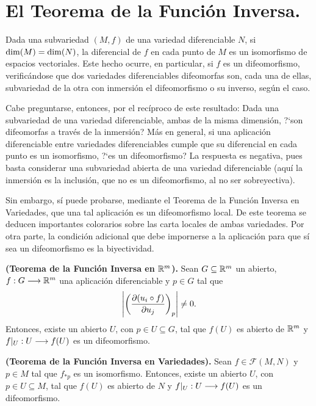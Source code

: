 \documentclass[Cursovd_portada.tex]{subfiles}
\begin{document}
\section{El Teorema de la Función Inversa.}
\hs Dada una subvariedad $(M,f)$ de una variedad diferenciable
$N$, si ${\rm dim}(M)={\rm dim}(N)$, la diferencial de $f$ en cada
punto de $M$ es un isomorfismo de espacios vectoriales. Este hecho
ocurre, en particular, si $f$ es un difeomorfismo,
verificándose que dos variedades diferenciables difeomorfas
son, cada una de ellas, subvariedad de la otra con inmersión
el difeomorfismo o su inverso, según el caso.
\par Cabe preguntarse, entonces, por el recíproco de este resultado: Dada una subvariedad de una variedad
diferenciable, ambas de la misma dimensión, ?`son difeomorfas
a través de la inmersión? Más en general, si una
aplicación diferenciable entre variedades diferenciables
cumple que su diferencial en cada punto es un isomorfismo, ?`es un
difeomorfismo? La respuesta es negativa, pues basta considerar una
subvariedad abierta de una variedad diferenciable (aquí la
inmersión es la inclusión, que no es un difeomorfismo, al
no ser sobreyectiva).
\par Sin embargo, sí puede probarse, mediante el Teorema de la Función Inversa en Variedades, que una tal aplicación
es un difeomorfismo local. De este teorema se deducen importantes
colorarios sobre las carta locales de ambas variedades. Por otra
parte, la condición adicional que debe impornerse a la
aplicación para que sí sea un difeomorfismo es la
biyectividad.
\begin{teorema}
{\bf (Teorema de la Función Inversa en $\mathbb{R}^m$).} Sean
$G\subseteq\mathbb{R}^m$ un abierto, $f:G\longrightarrow\mathbb{R}^m$ una aplicación
diferenciable y $p\in G$ tal que
$$\left|\left(\displaystyle{\frac{\partial (u_i\circ f)}{\partial u_j}}\right)_{p}\right|\neq 0.$$
Entonces, existe un abierto $U$, con $p\in U\subseteq G$, tal que
$f(U)$ es abierto de $\mathbb{R}^m$ y $f|_U:U\longrightarrow f(U)$ es un
difeomorfismo.
\end{teorema}
\begin{teorema}
{\bf (Teorema de la Función Inversa en Variedades).} Sean
$f\in\mathcal{F}(M,N)$ y $p\in M$ tal que $f_{*p}$ es un
isomorfismo. Entonces, existe un abierto $U$, con $p\in U\subseteq
M$, tal que $f(U)$ es abierto de $N$ y $f|_U:U\longrightarrow f(U)$ es un
difeomorfismo.
\end{teorema}
\end{document}
